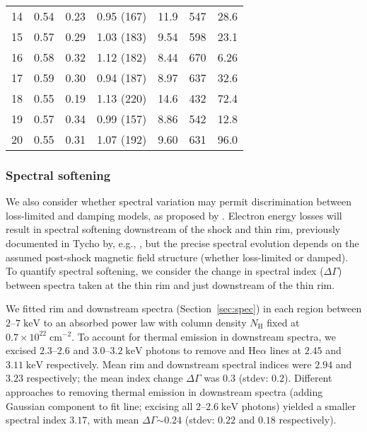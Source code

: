 \documentclass[iop, apj, numberedappendix]{emulateapj}
\newcommand*{\mt}{\mathrm}
\newcommand*{\unit}[1]{\;\mt{#1}}  %
\newcommand*{\abt}{\mathord{\sim}} %
\begin{document}
\begin{table}
\begin{tabular}{@{}l ccc ccr@{}}
    \cmidrule{1-7}
    14 & 0.54 & 0.23 & 0.95 (167) & 11.9 & 547 & 28.6 \\
    15 & 0.57 & 0.29 & 1.03 (183) & 9.54 & 598 & 23.1 \\
    16 & 0.58 & 0.32 & 1.12 (182) & 8.44 & 670 & 6.26 \\
    17 & 0.59 & 0.30 & 0.94 (187) & 8.97 & 637 & 32.6 \\
    \cmidrule{1-7}
    18 & 0.55 & 0.19 & 1.13 (220) & 14.6 & 432 & 72.4 \\
    19 & 0.57 & 0.34 & 0.99 (157) & 8.86 & 542 & 12.8 \\
    20 & 0.55 & 0.31 & 1.07 (192) & 9.60 & 631 & 96.0 \\
    \bottomrule
    \end{tabular}
\end{table}

\subsubsection{Spectral softening}

We also consider whether spectral variation may permit discrimination between
loss-limited and damping models, as proposed by \citet{rettig2012}.  Electron
energy losses will result in spectral softening downstream of the shock and
thin rim, previously documented in Tycho by, e.g., \citet{cassam-chenai2007},
but the precise spectral evolution depends on the assumed post-shock magnetic
field structure (whether loss-limited or damped).  To quantify spectral
softening, we consider the change in spectral index ($\Delta \Gamma$) between
spectra taken at the thin rim and just downstream of the thin rim.

We fitted rim and downstream spectra (Section~\ref{sec:spec}) in each region
between $2$--$7 \unit{keV}$ to an absorbed power law with column density
$N_{\mt{H}}$ fixed at $0.7 \times 10^{22} \unit{cm^{-2}}$.  To account for
thermal emission in downstream spectra, we excised $2.3$--$2.6$ and
$3.0$--$3.2 \unit{keV}$ photons to remove  and 
He$\alpha$ lines at $2.45$ and $3.11 \unit{keV}$ respectively.  Mean rim and
downstream spectral indices were $2.94$ and $3.23$ respectively; the mean
index change $\Delta \Gamma$ was $0.3$ (stdev: $0.2$).  Different approaches to
removing thermal emission in downstream spectra (adding Gaussian component to
fit  line; excising all $2$--$2.6 \unit{keV}$ photons) yielded a
smaller spectral index $3.17$, with mean $\Delta \Gamma \abt 0.24$ (stdev:
$0.22$ and $0.18$ respectively).
\end{document}
